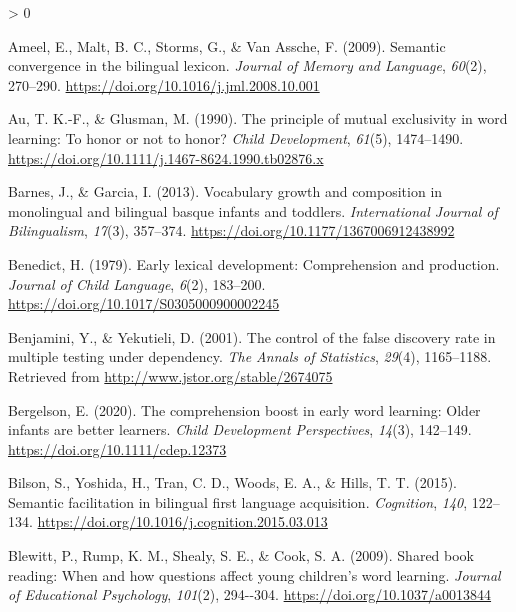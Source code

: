 \documentclass[
  english,
  ,man,floatsintext]{apa6}
\newlength{\cslhangindent}
\newenvironment{CSLReferences}[2] %
 {%
  \setlength{\parindent}{0pt}
  \ifodd #1 \everypar{\setlength{\hangindent}{\cslhangindent}}\ignorespaces\fi
  \ifnum #2 > 0
  \setlength{\parskip}{#2\baselineskip}
  \fi
 }%
 {}
\begin{document}
\hypertarget{refs}{}
\begin{CSLReferences}{1}{0}
\leavevmode\hypertarget{ref-Ameel_etal_2009}{}%
Ameel, E., Malt, B. C., Storms, G., \& Van Assche, F. (2009). Semantic convergence in the bilingual lexicon. \emph{Journal of Memory and Language}, \emph{60}(2), 270--290. \url{https://doi.org/10.1016/j.jml.2008.10.001}

\leavevmode\hypertarget{ref-Au_Glusman_1990}{}%
Au, T. K.-F., \& Glusman, M. (1990). The principle of mutual exclusivity in word learning: To honor or not to honor? \emph{Child Development}, \emph{61}(5), 1474--1490. \url{https://doi.org/10.1111/j.1467-8624.1990.tb02876.x}

\leavevmode\hypertarget{ref-Barnes_Garcia_2013}{}%
Barnes, J., \& Garcia, I. (2013). Vocabulary growth and composition in monolingual and bilingual basque infants and toddlers. \emph{International Journal of Bilingualism}, \emph{17}(3), 357--374. \url{https://doi.org/10.1177/1367006912438992}

\leavevmode\hypertarget{ref-Benedict_1979}{}%
Benedict, H. (1979). Early lexical development: Comprehension and production. \emph{Journal of Child Language}, \emph{6}(2), 183--200. \url{https://doi.org/10.1017/S0305000900002245}

\leavevmode\hypertarget{ref-Benjamini_Yekutieli_2001}{}%
Benjamini, Y., \& Yekutieli, D. (2001). The control of the false discovery rate in multiple testing under dependency. \emph{The Annals of Statistics}, \emph{29}(4), 1165--1188. Retrieved from \url{http://www.jstor.org/stable/2674075}

\leavevmode\hypertarget{ref-Bergelson_2020}{}%
Bergelson, E. (2020). The comprehension boost in early word learning: Older infants are better learners. \emph{Child Development Perspectives}, \emph{14}(3), 142--149. \url{https://doi.org/10.1111/cdep.12373}

\leavevmode\hypertarget{ref-Bilson_etal_2015}{}%
Bilson, S., Yoshida, H., Tran, C. D., Woods, E. A., \& Hills, T. T. (2015). Semantic facilitation in bilingual first language acquisition. \emph{Cognition}, \emph{140}, 122--134. \url{https://doi.org/10.1016/j.cognition.2015.03.013}

\leavevmode\hypertarget{ref-Blewitt_etal_2009}{}%
Blewitt, P., Rump, K. M., Shealy, S. E., \& Cook, S. A. (2009). Shared book reading: When and how questions affect young children's word learning. \emph{Journal of Educational Psychology}, \emph{101}(2), 294-\/-304. \url{https://doi.org/10.1037/a0013844}


\end{CSLReferences}
\end{document}
